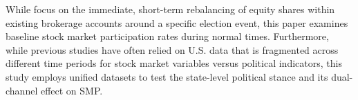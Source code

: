While \citet{meeuwis2022} focus on the immediate, short-term rebalancing of equity shares within existing brokerage accounts around a specific election event, this paper examines baseline stock market participation rates during normal times. Furthermore, while previous studies have often relied on U.S. data that is fragmented across different time periods for stock market variables versus political indicators, this study employs unified datasets to test the state-level political stance and its dual-channel effect on SMP. 
